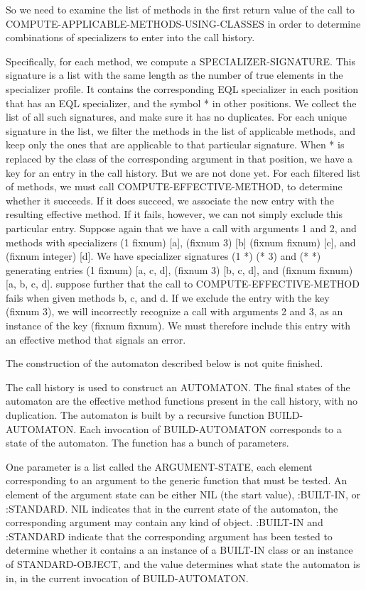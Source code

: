 So we need to examine the list of methods in the first return value of
the call to COMPUTE-APPLICABLE-METHODS-USING-CLASSES in order to
determine combinations of specializers to enter into the call history.

Specifically, for each method, we compute a SPECIALIZER-SIGNATURE.
This signature is a list with the same length as the number of true
elements in the specializer profile.  It contains the corresponding
EQL specializer in each position that has an EQL specializer, and the
symbol * in other positions. We collect the list of all such
signatures, and make sure it has no duplicates.  For each unique
signature in the list, we filter the methods in the list of applicable
methods, and keep only the ones that are applicable to that particular
signature.  When * is replaced by the class of the corresponding
argument in that position, we have a key for an entry in the call
history.  But we are not done yet.  For each filtered list of methods,
we must call COMPUTE-EFFECTIVE-METHOD, to determine whether it
succeeds.  If it does succeed, we associate the new entry with the
resulting effective method.  If it fails, however, we can not simply
exclude this particular entry.  Suppose again that we have a call with
arguments 1 and 2, and methods with specializers (1 fixnum) [a],
(fixnum 3) [b] (fixnum fixnum) [c], and (fixnum integer) [d].  We
have specializer signatures (1 *) (* 3) and (* *) generating entries
(1 fixnum) [a, c, d], (fixnum 3) [b, c, d], and (fixnum fixnum) [a, b,
c, d].  suppose further that the call to COMPUTE-EFFECTIVE-METHOD
fails when given methods b, c, and d.  If we exclude the entry with
the key (fixnum 3), we will incorrectly recognize a call with
arguments 2 and 3, as an instance of the key (fixnum fixnum).  We must
therefore include this entry with an effective method that signals an
error.

The construction of the automaton described below is not quite
finished.

The call history is used to construct an AUTOMATON.  The final states
of the automaton are the effective method functions present in the
call history, with no duplication.  The automaton is built by a
recursive function BUILD-AUTOMATON.  Each invocation of
BUILD-AUTOMATON corresponds to a state of the automaton.  The function
has a bunch of parameters.

One parameter is a list called the ARGUMENT-STATE, each element
corresponding to an argument to the generic function that must be
tested.  An element of the argument state can be either NIL (the start
value), :BUILT-IN, or :STANDARD.  NIL indicates that in the current
state of the automaton, the corresponding argument may contain any
kind of object.  :BUILT-IN and :STANDARD indicate that the
corresponding argument has been tested to determine whether it
contains a an instance of a BUILT-IN class or an instance of
STANDARD-OBJECT, and the value determines what state the automaton is
in, in the current invocation of BUILD-AUTOMATON.

